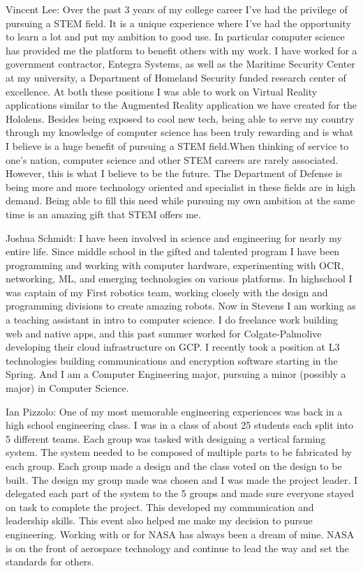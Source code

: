 \documentclass{article}
\begin{document}
Vincent Lee: Over the past 3 years of my college career I've had  the privilege of pursuing a STEM field. It is a unique experience where I’ve had the opportunity to learn a lot and put my ambition to good use. In particular computer science has provided me the platform to benefit others with my work. I have worked for a government contractor, Entegra Systems, as well as the Maritime Security Center at my university, a Department of Homeland Security funded research center of excellence. At both these positions I was able to work on Virtual Reality applications similar to the Augmented Reality application we have created for the Hololens. Besides being exposed to cool new tech, being able to serve my country through my knowledge of computer science has been truly rewarding and is what I believe is a huge benefit of pursuing a STEM field.When thinking of service to one’s nation, computer science and other STEM careers are rarely associated. However, this is what I believe to be the future. The Department of Defense is being more and more technology oriented and specialist in these fields are in high demand. Being able to fill this need while pursuing my own ambition at the same time is an amazing gift that STEM offers me.

Joshua Schmidt: I have been involved in science and engineering for nearly my entire life. Since middle school in the gifted and talented program I have been programming and working with computer hardware, experimenting with OCR, networking, ML, and emerging technologies on various platforms. In highschool I was captain of my First robotics team, working closely with the design and programming divisions to create amazing robots. Now in Stevens I am working as a teaching assistant in intro to computer science. I do freelance work building web and native apps, and this past summer worked for Colgate-Palmolive developing their cloud infrastructure on GCP. I recently took a position at L3 technologies building communications and encryption software starting in the Spring. And I am a Computer Engineering major, pursuing a minor (possibly a major) in Computer Science.

Ian Pizzolo: One of my most memorable engineering experiences was back in a high school engineering class. I was in a class of about 25 students each split into 5 different teams. Each group was tasked with designing a vertical farming system. The system needed to be composed of multiple parts to be fabricated by each group. Each group made a design and the class voted on the design to be built. The design my group made was chosen and I was made the project leader. I delegated each part of the system to the 5 groups and made sure everyone stayed on task to complete the project. This developed my communication and leadership skills. This event also helped me make my decision to pursue engineering. Working with or for NASA has always been a dream of mine. NASA is on the front of aerospace technology and continue to lead the way and set the standards for others.
\end{document}
